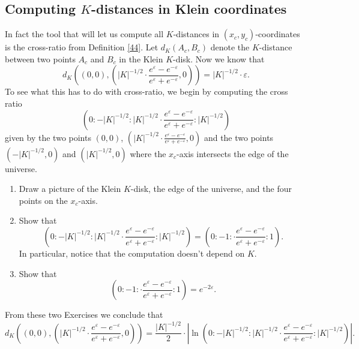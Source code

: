 \documentclass{ximera}
\begin{document}
\subsection*{Computing $K$-distances in Klein coordinates}

In fact the tool that will let us compute all $K$-distances in $\left(
x_{c},y_{c}\right)  $-coordinates is the cross-ratio from Definition \ref{44}.
Let $d_{K}\left(  A_{c},B_{c}\right)  $ denote the $K$-distance between two
points $A_{c}$ and $B_{c}$ in the Klein $K$-disk. Now we know that
\[
d_{K}\left(  \left(  0,0\right)  ,\left(  \left\vert K\right\vert
^{-1/2}\cdot \frac{e^{\varepsilon}-e^{-\varepsilon}%
}{e^{\varepsilon}+e^{-\varepsilon}},0\right)  \right)  =\left\vert
K\right\vert ^{-1/2}\cdot \varepsilon.
\]
To see what this has to do with cross-ratio, we begin by computing the cross
ratio%
\[
\left(  0:-\left\vert K\right\vert ^{-1/2}:\left\vert K\right\vert
^{-1/2}\cdot \frac{e^{\varepsilon}-e^{-\varepsilon}%
}{e^{\varepsilon}+e^{-\varepsilon}}:\left\vert K\right\vert ^{-1/2}\right)
\]
given by the two points $\left(  0,0\right)  $, $\left(  \left\vert
K\right\vert ^{-1/2}\cdot \frac{e^{\varepsilon
}-e^{-\varepsilon}}{e^{\varepsilon}+e^{-\varepsilon}},0\right)  $ and the two
points $\left(  -\left\vert K\right\vert ^{-1/2},0\right)  $ and $\left(
\left\vert K\right\vert ^{-1/2},0\right)  $ where the $x_{c}$-axis intersects
the edge of the universe.

\begin{exercise}\hfil
\begin{enumerate}
\item Draw a picture of the Klein $K$-disk, the edge of the universe,
  and the four points on the $x_{c}$-axis.
\item Show that%
\[
\left(  0:-\left\vert K\right\vert ^{-1/2}:\left\vert K\right\vert
^{-1/2}\cdot \frac{e^{\varepsilon}-e^{-\varepsilon}%
}{e^{\varepsilon}+e^{-\varepsilon}}:\left\vert K\right\vert ^{-1/2}\right)
=\left(  0:-1:\cdot \frac{e^{\varepsilon}-e^{-\varepsilon
}}{e^{\varepsilon}+e^{-\varepsilon}}:1\right)  .
\]
In particular, notice that the computation doesn't depend on $K$.

\item Show that%
\[
\left(  0:-1:\cdot \frac{e^{\varepsilon}-e^{-\varepsilon}%
}{e^{\varepsilon}+e^{-\varepsilon}}:1\right)  =e^{-2\varepsilon}.
\]
\end{enumerate}
\end{exercise}

From these two Exercises we conclude that%
\begin{equation}
d_{K}\left(  \left(  0,0\right)  ,\left(  \left\vert K\right\vert
^{-1/2}\cdot \frac{e^{\varepsilon}-e^{-\varepsilon}%
}{e^{\varepsilon}+e^{-\varepsilon}},0\right)  \right)  =\frac{\left\vert
K\right\vert ^{-1/2}}{2}\cdot \left\vert \ln %
\left(  0:-\left\vert K\right\vert ^{-1/2}:\left\vert K\right\vert
^{-1/2}\cdot \frac{e^{\varepsilon}-e^{-\varepsilon}%
}{e^{\varepsilon}+e^{-\varepsilon}}:\left\vert K\right\vert ^{-1/2}\right)
\right\vert . \label{78}%
\end{equation}
\end{document}
